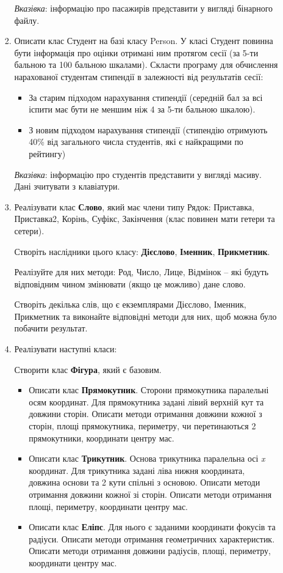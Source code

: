 \documentclass[a5paper,titlepage,openany,twoside,
]
{book_unv}%
\begin{document}
\begin{enumerate}
\begin{enumerate}
\begin{enumerate}
  \emph{\emph{Вказівка}}: інформацію про пасажирів представити у вигляді
бінарного файлу.

\item
  Описати клас Студент на базі класу Person. 
У класі Студент повинна бути інформація про оцінки отримані ним протягом
сесії (за 5-ти бальною та 100 бальною шкалами).
Скласти програму для обчислення нарахованої студентам стипендії в
залежності від результатів сесії:

\begin{itemize}
\item
  За старим підходом нарахування стипендії (середній бал за всі іспити
  має бути не меншим ніж 4 за 5-ти бальною шкалою).
\item
  З новим підходом нарахування стипендії (стипендію отримують 40\% від
  загального числа студентів, які є найкращими по рейтингу)
\end{itemize}

\emph{\emph{Вказівка}}: інформацію про студентів представити у вигляді
масиву. Дані зчитувати з клавіатури.

\item
  Реалізувати клас \textbf{Слово}, який має члени типу Рядок: Приставка,
  Приставка2, Корінь, Суфікс, Закінчення (клас повинен мати гетери та
  сетери).

Створіть наслідники цього класу: \textbf{Дієслово}, \textbf{Іменник}, \textbf{Прикметник}.

Реалізуйте для них методи: Род, Число, Лице, Відмінок -- які будуть
відповідним чином змінювати (якщо це можливо) дане слово.

Створіть декілька слів, що є екземплярами Дієслово, Іменник, Прикметник
та виконайте відповідні методи для них, щоб можна було побачити
результат.

\item
  Реалізувати наступні класи:

Створити клас \textbf{Фігура}, який є базовим.
\begin{itemize}
\item
Описати клас \textbf{Прямокутник}. Сторони прямокутника паралельні осям
координат. Для прямокутника задані лівий верхній кут та довжини сторін.
Описати методи отримання довжини кожної з сторін, площі прямокутника,
периметру, чи перетинаються 2 прямокутники, координати центру мас. 
\item
Описати клас \textbf{Трикутник}. Основа трикутника паралельна осі
\emph{x} координат. Для трикутника задані ліва нижня координата,
довжина основи та 2 кути спільні з основою. Описати методи отримання довжини кожної зі сторін.
Описати методи отримання площі, периметру, координати центру мас.  
\item
Описати клас \textbf{Еліпс}. Для нього є заданими координати фокусів та радіуси.
Описати методи отримання геометричних характеристик. Описати методи
отримання довжини радіусів, площі, периметру, координати центру мас. 
\end{itemize}


\end{enumerate}
\end{enumerate}
\end{enumerate}
\end{document}

